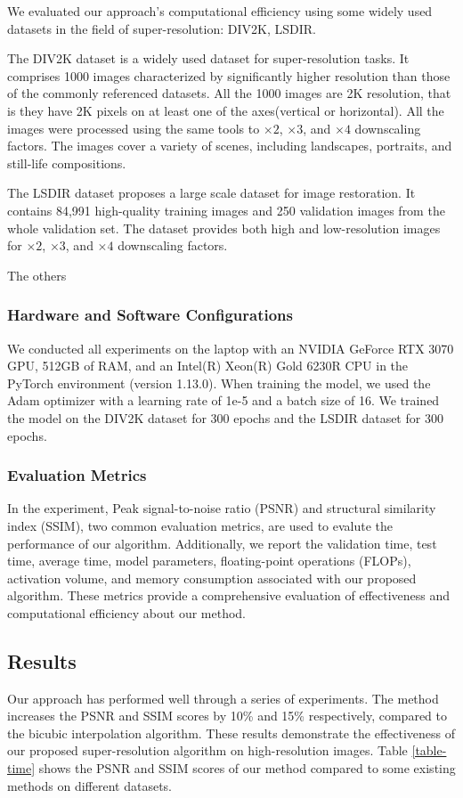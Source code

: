 \documentclass[10pt,twocolumn,letterpaper]{article}
\begin{document}
We evaluated our approach's computational efficiency using some widely used datasets in the field of super-resolution: DIV2K\cite{div2k}, LSDIR\cite{lilsdir}.

The DIV2K dataset is a widely used dataset for super-resolution tasks. It comprises 1000 images characterized by significantly higher resolution than those of the commonly referenced datasets. All the 1000 images are 2K resolution, that is they have 2K pixels on at least one of the axes(vertical or horizontal). All the images were processed using the same tools to $\times2$, $\times3$, and $\times4$ downscaling factors. The images cover a variety of scenes, including landscapes, portraits, and still-life compositions.

The LSDIR dataset proposes a large scale dataset for image restoration. It contains 84,991 high-quality training images and 250 validation images from the whole validation set. The dataset provides both high and low-resolution images for $\times2$, $\times3$, and $\times4$ downscaling factors.

The others 

\subsubsection{Hardware and Software Configurations}
We conducted all experiments on the laptop with an NVIDIA GeForce RTX 3070 GPU, 512GB of RAM, and an Intel(R) Xeon(R) Gold 6230R CPU in the PyTorch environment (version 1.13.0). When training the model, we used the Adam optimizer with a learning rate of 1e-5 and a batch size of 16. We trained the model on the DIV2K dataset for 300 epochs and the LSDIR dataset for 300 epochs.

\subsubsection{Evaluation Metrics}
In the experiment, Peak signal-to-noise ratio (PSNR) and structural similarity index (SSIM), two common evaluation metrics, are used to evalute the performance of our algorithm.  
Additionally, we report the validation time, test time, average time, model parameters, floating-point operations (FLOPs), activation volume, and memory consumption associated with our proposed algorithm. These metrics provide a comprehensive evaluation of effectiveness and computational efficiency about our method.

\subsection{Results}
Our approach has performed well through a series of experiments. The method increases the PSNR and SSIM scores by 10\% and 15\% respectively, compared to the bicubic interpolation algorithm. These results demonstrate the effectiveness of our proposed super-resolution algorithm on high-resolution images. Table \ref{table-time} shows the PSNR and SSIM scores of our method compared to some existing methods on different datasets.
\end{document}
